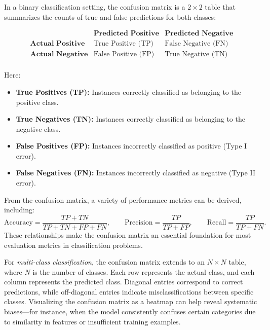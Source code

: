 \documentclass[12pt,a4paper]{report}
\begin{document}
\vspace{0.5em}
In a binary classification setting, the confusion matrix is a $2 \times 2$ table that summarizes the counts of true and false predictions for both classes:

\[
\begin{array}{c|cc}
 & \textbf{Predicted Positive} & \textbf{Predicted Negative} \\
\hline
\textbf{Actual Positive} & \text{True Positive (TP)} & \text{False Negative (FN)} \\
\textbf{Actual Negative} & \text{False Positive (FP)} & \text{True Negative (TN)} \\
\end{array}
\]

Here:
\begin{itemize}
    \item \textbf{True Positives (TP):} Instances correctly classified as belonging to the positive class.
    \item \textbf{True Negatives (TN):} Instances correctly classified as belonging to the negative class.
    \item \textbf{False Positives (FP):} Instances incorrectly classified as positive (Type I error).
    \item \textbf{False Negatives (FN):} Instances incorrectly classified as negative (Type II error).
\end{itemize}

\vspace{0.5em}
From the confusion matrix, a variety of performance metrics can be derived, including:
\[
\text{Accuracy} = \frac{TP + TN}{TP + TN + FP + FN}, \qquad
\text{Precision} = \frac{TP}{TP + FP}, \qquad
\text{Recall} = \frac{TP}{TP + FN}.
\]
These relationships make the confusion matrix an essential foundation for most evaluation metrics in classification problems.

\vspace{0.5em}
For \textit{multi-class classification}, the confusion matrix extends to an $N \times N$ table, where $N$ is the number of classes. 
Each row represents the actual class, and each column represents the predicted class. 
Diagonal entries correspond to correct predictions, while off-diagonal entries indicate misclassifications between specific classes. 
Visualizing the confusion matrix as a heatmap can help reveal systematic biases—for instance, when the model consistently confuses certain categories due to similarity in features or insufficient training examples.
\end{document}
